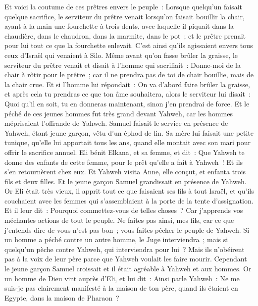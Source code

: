 \begin{multicols}{2}
Et voici la coutume de ces prêtres envers le peuple~: Lorsque quelqu'un faisait quelque sacrifice, le serviteur du prêtre venait lorsqu'on faisait bouillir la chair, ayant à la main une fourchette à trois dents,
avec laquelle il piquait dans la chaudière, dans le chaudron, dans la marmite, dans le pot~; et le prêtre prenait pour lui tout ce que la fourchette enlevait. C'est ainsi qu'ils agissaient envers tous ceux d'Israël qui venaient à Silo.
Même avant qu'on fasse brûler la graisse, le serviteur du prêtre venait et disait à l'homme qui sacrifiait~: Donne-moi de la chair à rôtir pour le prêtre~; car il ne prendra pas de toi de chair bouillie, mais de la chair crue.
Et si l'homme lui répondait~: On va d'abord faire brûler la graisse, et après cela tu prendras ce que ton âme souhaitera, alors le serviteur lui disait~: Quoi qu'il en soit, tu en donneras maintenant, sinon j'en prendrai de force.
Et le péché de ces jeunes hommes fut très grand devant Yahweh, car les hommes méprisaient l'offrande de Yahweh.
Samuel faisait le service en présence de Yahweh, étant jeune garçon, vêtu d'un éphod de lin.
Sa mère lui faisait une petite tunique, qu'elle lui apportait tous les ans, quand elle montait avec son mari pour offrir le sacrifice annuel.
Eli bénit Elkana, et sa femme, et dit~: Que Yahweh te donne des enfants de cette femme, pour le prêt qu'elle a fait à Yahweh~! Et ils s'en retournèrent chez eux.
Et Yahweh visita Anne, elle conçut, et enfanta trois fils et deux filles. Et le jeune garçon Samuel grandissait en présence de Yahweh.
Or Eli était très vieux, il apprit tout ce que faisaient ses fils à tout Israël, et qu'ils couchaient avec les femmes qui s'assemblaient à la porte de la tente d'assignation.
Et il leur dit~: Pourquoi commettez-vous de telles choses~? Car j'apprends vos méchantes actions de tout le peuple.
Ne faites pas ainsi, mes fils, car ce que j'entends dire de vous n'est pas bon~; vous faites pécher le peuple de Yahweh.
Si un homme a péché contre un autre homme, le Juge interviendra~; mais si quelqu'un pèche contre Yahweh, qui interviendra pour lui~? Mais ils n'obéirent pas à la voix de leur père parce que Yahweh voulait les faire mourir.
Cependant le jeune garçon Samuel croissait et il était agréable à Yahweh et aux hommes.
Or un homme de Dieu vint auprès d'Eli, et lui dit~: Ainsi parle Yahweh~: Ne me suis-je pas clairement manifesté à la maison de ton père, quand ils étaient en Egypte, dans la maison de Pharaon~?

\end{multicols}
